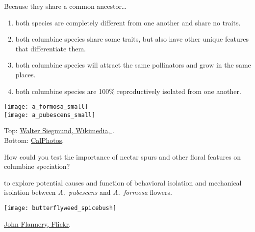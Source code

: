 \documentclass[t,hidelinks]{beamer}
\newcommand{\ques}[1]{\highlight{\textsc{q#1:}}}
\begin{document}
\begin{frame}[t]{\ques3 Because they share a common ancestor\dots}
	
	\begin{multicols}{2}
		\begin{enumerate}
			\item both species are completely different from one another and share no traits. 
			
			\item \alert<2>{both columbine species share some traits, but also have other unique features that differentiate them.}
			
			\item both columbine species will attract the same pollinators and grow in the same places.
			
			\item both columbine species are 100\% reproductively isolated from one another.
		\end{enumerate}

	\columnbreak

		{\centering
		\texttt{[image: a\_formosa\_small]}\\
		\texttt{[image: a\_pubescens\_small]}\\
		}
	\end{multicols}

	\vfilll
	
	\hfill \tiny Top: \href{http://species.wikimedia.org/wiki/File:Aquilegia_formosa_14962.JPG}{Walter Siegmund, Wikimedia, }. \\ \hfill Bottom: \href{http://calphotos.berkeley.edu/cgi/img_query?enlarge=0000+0000+1209+2492
}{CalPhotos, }
\end{frame}
%
\begin{frame}[t]{How could you test the importance of nectar spurs and other floral features on columbine speciation?}
	
	\begin{multicols}{2}

	\hangpara {} to explore potential causes and function of behavioral isolation and mechanical isolation between \textit{A.~pubescens} and \textit{A.~formosa} flowers.

	\columnbreak
	
		\texttt{[image: butterflyweed\_spicebush]}
	\end{multicols}

	\vfilll
	
	\hfill \tiny \href{https://www.flickr.com/photos/drphotomoto/3638805249}{John Flannery, Flickr, }
\end{frame}
\end{document}
